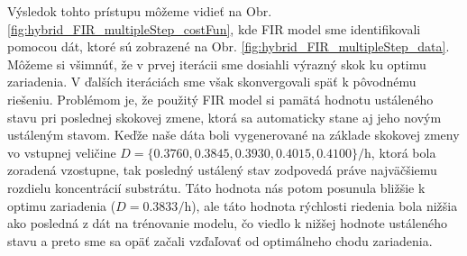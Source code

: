 Výsledok tohto prístupu môžeme vidieť na Obr. \ref{fig:hybrid_FIR_multipleStep_costFun}, kde FIR model sme identifikovali pomocou dát, ktoré sú zobrazené na Obr. \ref{fig:hybrid_FIR_multipleStep_data}. Môžeme si všimnúť, že v prvej iterácii sme dosiahli výrazný skok ku optimu zariadenia. V ďalších iteráciách sme však skonvergovali späť k pôvodnému riešeniu. Problémom je, že použitý FIR model si pamätá hodnotu ustáleného stavu pri poslednej skokovej zmene, ktorá sa automaticky stane aj jeho novým ustáleným stavom. Keďže naše dáta boli vygenerované na základe skokovej zmeny vo vstupnej veličine $ D = \lbrace 0.3760, 0.3845, 0.3930, 0.4015, 0.4100 \rbrace \si{\per\hour} $, ktorá bola zoradená vzostupne, tak posledný ustálený stav zodpovedá práve najväčšiemu rozdielu koncentrácií substrátu. Táto hodnota nás potom posunula bližšie k optimu zariadenia ($ D = 0.3833\si{\per\hour} $), ale táto hodnota rýchlosti riedenia bola nižšia ako posledná z dát na trénovanie modelu, čo viedlo k nižšej hodnote ustáleného stavu a preto sme sa opäť začali vzďaľovať od optimálneho chodu zariadenia.
